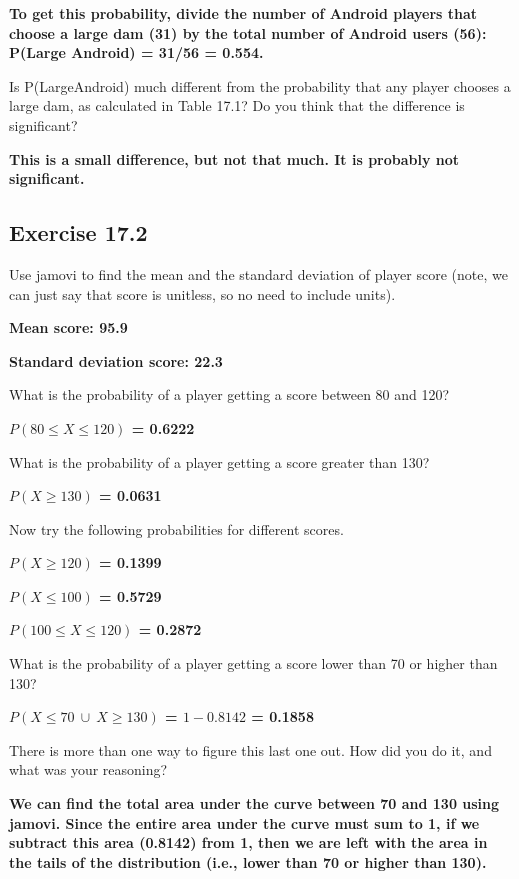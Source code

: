 \documentclass[
  openany]{krantz}
\begin{document}
\textbf{To get this probability, divide the number of Android players that choose a large dam (31) by the total number of Android users (56): P(Large \textbar{} Android) = 31/56 = 0.554.}

Is P(Large\textbar Android) much different from the probability that any player chooses a large dam, as calculated in Table 17.1? Do you think that the difference is significant?

\textbf{This is a small difference, but not that much. It is probably not significant.}

\hypertarget{exercise-17.2}{%
\subsection{Exercise 17.2}\label{exercise-17.2}}

Use jamovi to find the mean and the standard deviation of player score (note, we can just say that score is unitless, so no need to include units).

\textbf{Mean score: 95.9}

\textbf{Standard deviation score: 22.3}

What is the probability of a player getting a score between 80 and 120?

\textbf{\(P(80 \leq X \leq 120)\) = 0.6222}

What is the probability of a player getting a score greater than 130?

\textbf{\(P(X \geq 130)\) = 0.0631}

Now try the following probabilities for different scores.

\textbf{\(P(X \geq 120)\) = 0.1399}

\textbf{\(P(X \leq 100)\) = 0.5729}

\textbf{\(P(100 \leq X \leq 120)\) = 0.2872}

What is the probability of a player getting a score lower than 70 or higher than 130?

\textbf{\(P(X \leq 70 \: \cup \: X \geq 130)\) = \(1 - 0.8142\) = 0.1858}

There is more than one way to figure this last one out. How did you do it, and what was your reasoning?

\textbf{We can find the total area under the curve between 70 and 130 using jamovi. Since the entire area under the curve must sum to 1, if we subtract this area (0.8142) from 1, then we are left with the area in the tails of the distribution (i.e., lower than 70 or higher than 130).}
\end{document}
